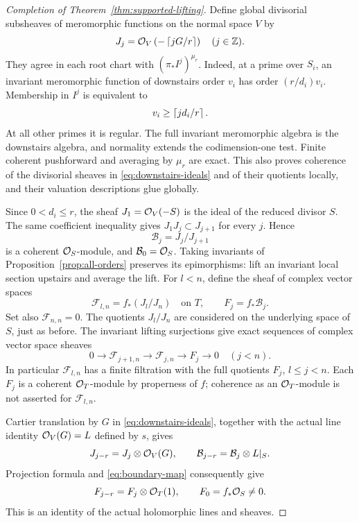 \begin{proof}[Completion of Theorem~\ref{thm:supported-lifting}]
Define global divisorial subsheaves of meromorphic functions on the
normal space \(V\) by
\begin{equation}\label{eq:downstairs-ideals}
 J_j=\mathcal O_V\left(-\left\lceil jG/r\right\rceil\right)\quad(j\in\mathbb Z).
\end{equation}
They agree in each root chart with \((\pi_*I^j)^{\mu_r}\).  Indeed, at
a prime over \(S_i\), an invariant meromorphic function of downstairs
order \(v_i\) has order \((r/d_i)v_i\).  Membership in \(I^j\) is
equivalent to
\[
 v_i\geq\left\lceil jd_i/r\right\rceil.
\]
At all other primes it is regular.  The full invariant meromorphic
algebra is the downstairs algebra, and normality extends the
codimension-one test.  Finite coherent pushforward and averaging by
\(\mu_r\) are exact.  This also proves coherence of the divisorial
sheaves in \eqref{eq:downstairs-ideals} and of their quotients locally,
and their valuation descriptions glue globally.

Since \(0<d_i\leq r\), the sheaf \(J_1=\mathcal O_V(-S)\) is the ideal of the
reduced divisor \(S\).  The same coefficient inequality gives
\(J_1J_j\subset J_{j+1}\) for every \(j\).  Hence
\[
 \mathcal B_j=J_j/J_{j+1}
\]
is a coherent \(\mathcal O_S\)-module, and \(\mathcal B_0=\mathcal O_S\).
Taking invariants of Proposition~\ref{prop:all-orders} preserves its
epimorphisms: lift an invariant local section upstairs and average the
lift.  For \(l<n\), define the sheaf of complex vector spaces
\[
 \mathscr F_{l,n}=f_*(J_l/J_n)\quad\text{on }T,
 \qquad F_j=f_*\mathcal B_j.
\]
Set also \(\mathscr F_{n,n}=0\).
The quotients \(J_l/J_n\) are considered on the underlying space of
\(S\), just as before.  The invariant lifting surjections give exact
sequences of complex vector space sheaves
\begin{equation}\label{eq:downstairs-filtration}
 0\longrightarrow\mathscr F_{j+1,n}\longrightarrow\mathscr F_{j,n}
 \longrightarrow F_j\longrightarrow0\quad(j<n).
\end{equation}
In particular \(\mathscr F_{l,n}\) has a finite filtration with the
full quotients \(F_j\), \(l\leq j<n\).  Each \(F_j\) is a coherent
\(\mathcal O_T\)-module by properness of \(f\); coherence as an \(\mathcal O_T\)-module
is not asserted for \(\mathscr F_{l,n}\).

Cartier translation by \(G\) in \eqref{eq:downstairs-ideals}, together
with the actual line identity \(\mathcal O_V(G)=L\) defined by \(s\), gives
\[
 J_{j-r}=J_j\otimes\mathcal O_V(G),\qquad
 \mathcal B_{j-r}=\mathcal B_j\otimes L|_S.
\]
Projection formula and \eqref{eq:boundary-map} consequently give
\begin{equation}\label{eq:periodic-layers}
 F_{j-r}=F_j\otimes\mathcal O_T(1),\qquad F_0=f_*\mathcal O_S\ne0.
\end{equation}
This is an identity of the actual holomorphic lines and sheaves.


\end{proof}
